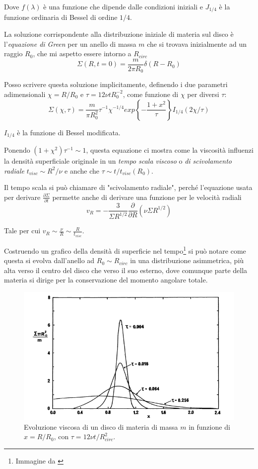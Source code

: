 \documentclass[a4paperbi]{article}
\begin{document}
	Dove $f(\lambda)$ è una funzione che dipende dalle condizioni iniziali e $J_{1/4}$ è la funzione ordinaria di Bessel di ordine $1/4$.
	
	La soluzione corrispondente alla distribuzione iniziale di materia sul disco è l'\textit{equazione di Green} per un anello di massa $m$ che si trovava inizialmente ad un raggio $R_0$, che mi aspetto essere intorno a $R_{circ}$
	\begin{equation}
		\Sigma(R,t=0)=\frac{m}{2\pi R_0}\delta(R-R_0)
	\end{equation}
	
	Posso scrivere questa soluzione implicitamente, definendo i due parametri adimensionali $\chi=R/R_0$ e $\tau=12\nu tR_0^{-2}$, come funzione di $\chi$ per diversi $\tau$:
	\begin{equation}
	\Sigma(\chi,\tau)=\frac{m}{\pi R_0^2}\tau^{-1}\chi^{-1/4}exp\left\{-\frac{1+x^2}{\tau}\right\}I_{1/4}(2\chi/\tau)
	\end{equation}
	
	$I_{1/4}$ è la funzione di Bessel modificata.
	
	Ponendo $(1+\chi^2)\tau^{-1}\sim 1$, questa equazione ci mostra come la viscosità influenzi la densità superficiale originale in un \textit{tempo scala viscoso} o \textit{di scivolamento radiale} $t_{visc}\sim R^2/\nu$ e anche che $\tau\sim t/t_{visc}(R_0)$.
	
	Il tempo scala si può chiamare di "scivolamento radiale", perché l'equazione usata per derivare $\frac{\partial\Sigma}{\partial t}$ permette anche di derivare una funzione per le velocità radiali
	\begin{equation}
		v_R=-\frac{3}{\Sigma R^{1/2}}\frac{\partial}{\partial R}(\nu\Sigma R^{1/2})
	\end{equation}
	
	Tale per cui $v_R\sim\frac{\nu}{R}\sim\frac{R}{t_{visc}}$.
	
	Costruendo un grafico della densità di superficie nel tempo\footnote{Immagine da \cite{Pringle1981}} si può notare come questa si evolva dall'anello ad $R_0\sim R_{circ}$ in una distribuzione asimmetrica, più alta verso il centro del disco che verso il suo esterno, dove comunque parte della materia si dirige per la conservazione del momento angolare totale.
	
	\begin{figure}[H]
		\centering
		\includegraphics[width=0.7\linewidth]{DensSuper}
		\caption{Evoluzione viscosa di un disco di materia di massa $m$ in funzione di $x=R/R_0$, con $\tau=12\nu t/R_{circ}^2$.}
		\label{fig:denssuper}
	\end{figure}
\end{document}
